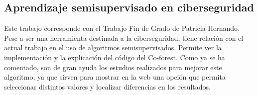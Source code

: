 \subsection{Aprendizaje semisupervisado en ciberseguridad}
Este trabajo corresponde con el Trabajo Fin de Grado de Patricia Hernando. Pese a ser una herramienta destinada a la ciberseguridad, tiene relación con el actual trabajo en el uso de algoritmos semisupervisados. Permite ver la implementación y la explicación del código del Co-forest. Como ya se ha comentado, son de gran ayuda los estudios realizados para mejorar este algoritmo, ya que sirven para mostrar en la web una opción que permita seleccionar distintos valores y localizar diferencias en los resultados.